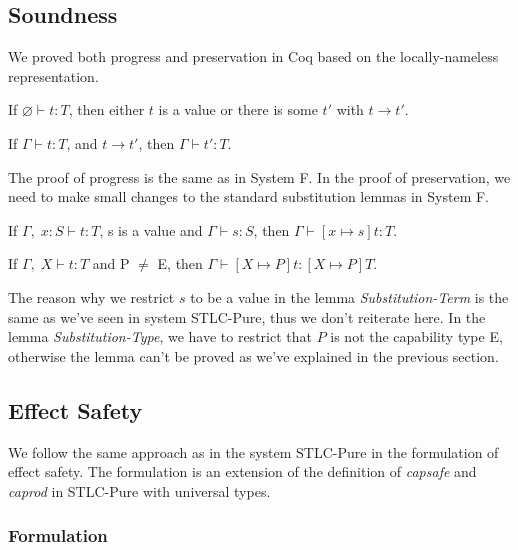 \subsection{Soundness}

We proved both progress and preservation in Coq based on the
locally-nameless representation.

\begin{theorem}[Progress]
If $\varnothing \vdash t : T$, then either $t$ is a value or there is some
$t'$ with $t \longrightarrow t'$.
\end{theorem}

\begin{theorem}[Preservation]
If $\Gamma \vdash t : T$, and $t \longrightarrow t'$, then $\Gamma
\vdash t' : T$.
\end{theorem}

The proof of progress is the same as in System F. In the proof of
preservation, we need to make small changes to the standard
substitution lemmas in System F.

\begin{lemma}
  If $\Gamma,\; x:S \vdash t : T$, s is a value and
  $\Gamma \vdash s : S$, then $\Gamma \vdash [x \mapsto s]t : T$.
\end{lemma}

\begin{lemma}
  If $\Gamma,\; X \vdash t : T$ and P $\neq$ E,
  then $\Gamma \vdash [X \mapsto P]t : [X \mapsto P]T$.
\end{lemma}

The reason why we restrict $s$ to be a value in the lemma
\emph{Substitution-Term} is the same as we've seen in system
STLC-Pure, thus we don't reiterate here. In the lemma
\emph{Substitution-Type}, we have to restrict that $P$ is not the
capability type E, otherwise the lemma can't be proved as we've
explained in the previous section.

\subsection{Effect Safety}

We follow the same approach as in the system STLC-Pure in the
formulation of effect safety. The formulation is an extension of the
definition of \emph{capsafe} and \emph{caprod} in STLC-Pure with
universal types.

\subsubsection{Formulation}

